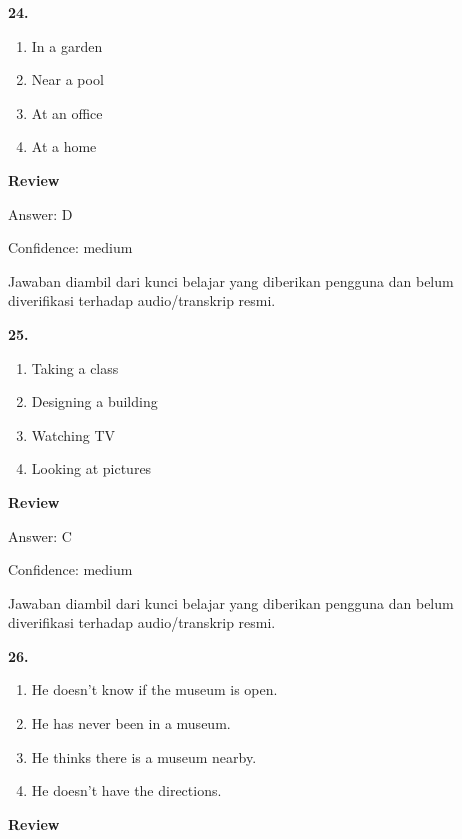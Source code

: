 \documentclass[12pt]{article}
\begin{document}
\noindent\textbf{24.}
\begin{enumerate}[label=(\Alph*),leftmargin=*,itemsep=0.2em]
\item In a garden
\item Near a pool
\item At an office
\item At a home
\end{enumerate}
\par
\begingroup
\setlength{\parskip}{0pt}
\setlength{\parindent}{0pt}
\textbf{Review}\par
Answer: D\par
Confidence: medium\par
Jawaban diambil dari kunci belajar yang diberikan pengguna dan belum diverifikasi terhadap audio/transkrip resmi.\par
\endgroup
\par
\vspace{0.25\baselineskip}
\noindent\textbf{25.}
\begin{enumerate}[label=(\Alph*),leftmargin=*,itemsep=0.2em]
\item Taking a class
\item Designing a building
\item Watching TV
\item Looking at pictures
\end{enumerate}
\par
\begingroup
\setlength{\parskip}{0pt}
\setlength{\parindent}{0pt}
\textbf{Review}\par
Answer: C\par
Confidence: medium\par
Jawaban diambil dari kunci belajar yang diberikan pengguna dan belum diverifikasi terhadap audio/transkrip resmi.\par
\endgroup
\par
\vspace{0.25\baselineskip}
\noindent\textbf{26.}
\begin{enumerate}[label=(\Alph*),leftmargin=*,itemsep=0.2em]
\item He doesn't know if the museum is open.
\item He has never been in a museum.
\item He thinks there is a museum nearby.
\item He doesn't have the directions.
\end{enumerate}
\par
\begingroup
\setlength{\parskip}{0pt}
\setlength{\parindent}{0pt}
\textbf{Review}\par
\end{document}
